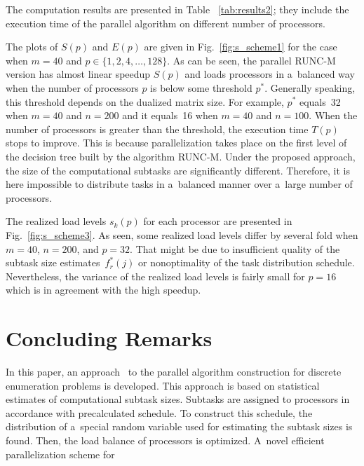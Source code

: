 \begin{multicols}{2}
The computation results are presented in Table
~\ref{tab:results2}; they include the execution time of the
parallel algorithm on different number of processors. 

The plots of
$S(p)$ and $E(p)$ are given in Fig.~\ref{fig:s_scheme1} %
for the
case when $m=40$ and $p\in\{1,2,4,\ldots,128\}$.
As can be seen, the parallel RUNC-M
version has almost linear speedup $S(p)$ and loads processors in a~balanced way when the number of processors $p$ is below some
threshold $p^*$. Generally speaking, this threshold depends on the
dualized matrix size. For example, $p^*$ equals~32 when $m=40$ and
$n=200$ and it equals~16 when $m=40$ and $n=100$. When the number of
processors is greater than the threshold, the execution time
$T(p)$ stops to improve. This is because parallelization takes
place on the first level of the decision tree built by the
algorithm RUNC-M. Under the proposed approach, the size of the
computational subtasks are significantly different. Therefore, it
 is here impossible to distribute tasks in a~balanced manner over a~large
number of processors.

The realized load levels $s_k(p)$ for each processor are presented
in Fig.~\ref{fig:s_scheme3}. As seen, 
some realized
load levels differ by several fold when $m = 40$, $n = 200$, and
$p=32$. That might be due to insufficient quality of the subtask
size estimates~$f_r^*(j)$ or nonoptimality of the task
distribution schedule. Nevertheless, the variance of the realized
load levels is fairly small for $p=16$ which is in agreement with
the high speedup.


\section{Concluding Remarks}

\noindent
In this paper, an approach~\cite{DNP2014} to the parallel algorithm
construction for discrete enumeration problems is developed.
This approach is based on statistical estimates of computational
subtask sizes.
Subtasks are assigned to processors in accordance with
precalculated schedule.
To construct this schedule, the distribution of a~special random
variable used for estimating the subtask sizes is found. Then, the
load balance of processors is optimized.
A~novel efficient parallelization scheme for\linebreak\vspace*{-12pt}

\pagebreak

\end{multicols}

